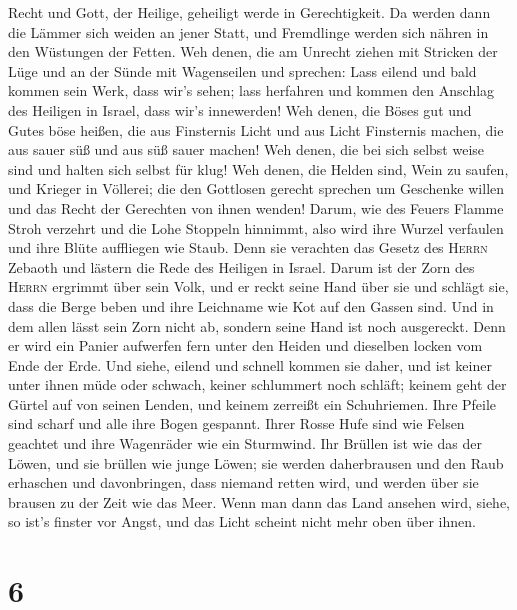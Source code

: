 Recht und Gott, der Heilige, geheiligt werde in Gerechtigkeit.
 Da werden dann die Lämmer sich weiden an jener Statt,
und Fremdlinge werden sich nähren in den Wüstungen der Fetten.
 Weh denen, die am Unrecht ziehen mit Stricken der Lüge
und an der Sünde mit Wagenseilen  und sprechen: Lass
eilend und bald kommen sein Werk, dass wir's sehen; lass herfahren und
kommen den Anschlag des Heiligen in Israel, dass wir's innewerden!
 Weh denen, die Böses gut und Gutes böse heißen, die aus
Finsternis Licht und aus Licht Finsternis machen, die aus sauer süß und
aus süß sauer machen!  Weh denen, die bei sich selbst
weise sind und halten sich selbst für klug!  Weh denen,
die Helden sind, Wein zu saufen, und Krieger in Völlerei;
 die den Gottlosen gerecht sprechen um Geschenke willen
und das Recht der Gerechten von ihnen wenden!  Darum, wie
des Feuers Flamme Stroh verzehrt und die Lohe Stoppeln hinnimmt, also
wird ihre Wurzel verfaulen und ihre Blüte auffliegen wie Staub. Denn sie
verachten das Gesetz des \textsc{Herrn} Zebaoth und lästern die Rede des
Heiligen in Israel.  Darum ist der Zorn des
\textsc{Herrn} ergrimmt über sein Volk, und er reckt seine Hand über sie
und schlägt sie, dass die Berge beben und ihre Leichname wie Kot auf den
Gassen sind. Und in dem allen lässt sein Zorn nicht ab, sondern seine
Hand ist noch ausgereckt.  Denn er wird ein Panier
aufwerfen fern unter den Heiden und dieselben locken vom Ende der Erde.
Und siehe, eilend und schnell kommen sie daher,  und ist
keiner unter ihnen müde oder schwach, keiner schlummert noch schläft;
keinem geht der Gürtel auf von seinen Lenden, und keinem zerreißt ein
Schuhriemen.  Ihre Pfeile sind scharf und alle ihre Bogen
gespannt. Ihrer Rosse Hufe sind wie Felsen geachtet und ihre Wagenräder
wie ein Sturmwind.  Ihr Brüllen ist wie das der Löwen,
und sie brüllen wie junge Löwen; sie werden daherbrausen und den Raub
erhaschen und davonbringen, dass niemand retten wird, 
und werden über sie brausen zu der Zeit wie das Meer. Wenn man dann das
Land ansehen wird, siehe, so ist's finster vor Angst, und das Licht
scheint nicht mehr oben über ihnen.

\hypertarget{section-5}{%
\section{6}\label{section-5}}

